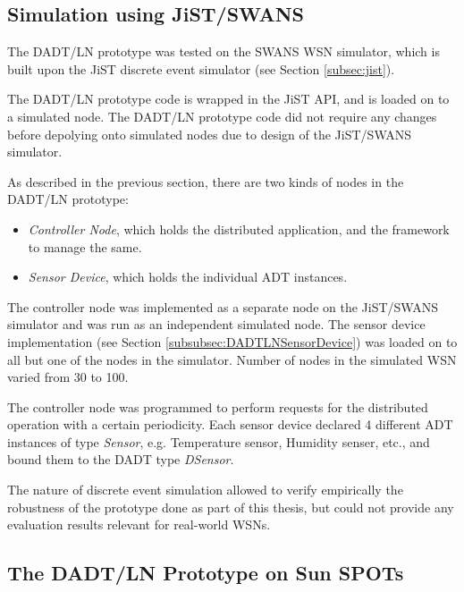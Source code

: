 \subsection{Simulation using JiST/SWANS}

The DADT/LN prototype was tested on the SWANS WSN simulator, which is built upon
the JiST discrete event simulator (see Section \ref{subsec:jist}). 

The DADT/LN prototype code is wrapped in the JiST API, and is loaded on to a
simulated node. 
The DADT/LN prototype code did not require any changes before depolying
onto simulated nodes due to design of the JiST/SWANS simulator.

As described in the previous section, there are two kinds of
nodes in the DADT/LN prototype:

\begin{itemize}
  \item \emph{Controller Node}, which holds the distributed application, and the
  framework to manage the same.
  \item \emph{Sensor Device}, which holds the individual ADT instances. 
\end{itemize}

The controller node was implemented as a separate node on the JiST/SWANS
simulator and was run as an independent simulated node. The sensor device
implementation (see Section \ref{subsubsec:DADTLNSensorDevice}) was loaded on to all but one of the nodes in
the simulator. Number of nodes in the simulated WSN varied from 30 to 100. 

The controller node was programmed to perform requests for the
distributed operation with a certain periodicity. 
Each sensor device declared 4 different ADT instances of type \emph{Sensor},
e.g. Temperature sensor, Humidity senser, etc., and bound them to the DADT type
\emph{DSensor}. 

The nature of discrete event simulation allowed to verify empirically the
robustness of the prototype done as part of this thesis, but could not provide any evaluation
results relevant for real-world WSNs.


\subsection{The DADT/LN Prototype on Sun SPOTs}

